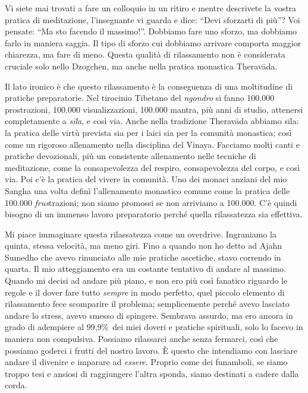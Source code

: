 Vi siete mai trovati a fare un colloquio in un ritiro e mentre descrivete la vostra pratica di meditazione, l'insegnante vi guarda e dice: ``Devi sforzarti di più''? Voi pensate: ``Ma sto facendo il massimo!''. Dobbiamo fare uno sforzo, ma dobbiamo farlo in maniera saggia. Il tipo di sforzo cui dobbiamo arrivare comporta maggior chiarezza, ma fare di meno. Questa qualità di rilassamento non è considerata cruciale solo nello Dzogchen, ma anche nella pratica monastica Theravāda.

Il lato ironico è che questo rilassamento è la conseguenza di una moltitudine di pratiche preparatorie. Nel tirocinio Tibetano del \textit{ngondro }si fanno 100.000 prostrazioni, 100.000 visualizzazioni, 100.000 mantra, più anni di studio, attenersi completamente a \textit{sīla}, e così via. Anche nella tradizione Theravāda abbiamo sīla: la pratica delle virtù prevista sia per i laici sia per la comunità monastica; così come un rigoroso allenamento nella disciplina del Vinaya. Facciamo molti canti e pratiche devozionali, più un consistente allenamento nelle tecniche di meditazione, come la consapevolezza del respiro, consapevolezza del corpo, e così via. Poi c'è la pratica del vivere in comunità. Uno dei monaci anziani del mio Sangha una volta definì l'allenamento monastico comune come la pratica delle 100.000 \textit{frus}trazioni; non siamo promossi se non arriviamo a 100.000. C'è quindi bisogno di un immenso lavoro preparatorio perché quella rilassatezza sia effettiva.

Mi piace immaginare questa rilassatezza come un overdrive. Ingraniamo la quinta, stessa velocità, ma meno giri. Fino a quando non ho detto ad Ajahn Sumedho che avevo rinunciato alle mie pratiche ascetiche, stavo correndo in quarta. Il mio atteggiamento era un costante tentativo di andare al massimo. Quando mi decisi ad andare più piano, e non ero più così fanatico riguardo le regole e il dover fare tutto \textit{sempre} in modo perfetto, quel piccolo elemento di rilassamento fece scomparire il problema; semplicemente perché avevo lasciato andare lo stress, avevo smesso di spingere. Sembrava assurdo, ma ero ancora in grado di adempiere al 99,9\%\ dei miei doveri e pratiche spirituali, solo lo facevo in maniera non compulsiva. Possiamo rilassarci anche senza fermarci, così che possiamo goderci i frutti del nostro lavoro. È questo che intendiamo con lasciare andare il divenire e imparare ad \textit{essere}. Proprio come dei funamboli, se siamo troppo tesi e ansiosi di raggiungere l'altra sponda, siamo destinati a cadere dalla corda.

